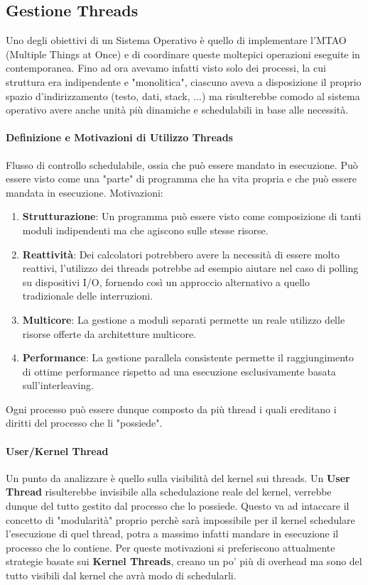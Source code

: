 \documentclass{article}
\begin{document}
\newpage

\subsection{Gestione Threads}

Uno degli obiettivi di un Sistema Operativo è quello di implementare l'MTAO (Multiple Things at Once) e di coordinare queste moltepici operazioni
eseguite in contemporanea. Fino ad ora avevamo infatti visto solo dei processi, la cui struttura era indipendente e "monolitica", ciascuno aveva
a disposizione il proprio spazio d'indirizzamento (testo, dati, stack, ...) ma risulterebbe comodo al sistema operativo avere anche unità più
dinamiche e schedulabili in base alle necessità.

\paragraph{Definizione e Motivazioni di Utilizzo Threads} Flusso di controllo schedulabile, ossia che può essere mandato in esecuzione. Può essere visto come una "parte" di programma
che ha vita propria e che può essere mandata in esecuzione. Motivazioni:

\begin{enumerate}
    \item \textbf{Strutturazione}: Un programma può essere visto come composizione di tanti moduli indipendenti ma che agiscono sulle stesse risorse.
    \item \textbf{Reattività}: Dei calcolatori potrebbero avere la necessità di essere molto reattivi, l'utilizzo dei threads potrebbe ad esempio aiutare
    nel caso di polling su dispositivi I/O, fornendo così un approccio alternativo a quello tradizionale delle interruzioni.
    \item \textbf{Multicore}: La gestione a moduli separati permette un reale utilizzo delle risorse offerte da architetture multicore.
    \item \textbf{Performance}: La gestione parallela consistente permette il raggiungimento di ottime performance rispetto ad una esecuzione esclusivamente basata sull'interleaving.
\end{enumerate}

Ogni processo può essere dunque composto da più thread i quali ereditano i diritti del processo che li "possiede".

\paragraph{User/Kernel Thread} Un punto da analizzare è quello sulla visibilità del kernel sui threads. Un \textbf{User Thread} risulterebbe invisibile
alla schedulazione reale del kernel, verrebbe dunque del tutto gestito dal processo che lo possiede. Questo va ad intaccare il concetto di "modularità"
proprio perchè sarà impossibile per il kernel schedulare l'esecuzione di quel thread, potra a massimo infatti mandare in esecuzione il processo che lo contiene.
Per queste motivazioni si preferiscono attualmente strategie basate sui \textbf{Kernel Threads}, creano un po' più di overhead ma sono del tutto visibili
dal kernel che avrà modo di schedularli.
\end{document}

